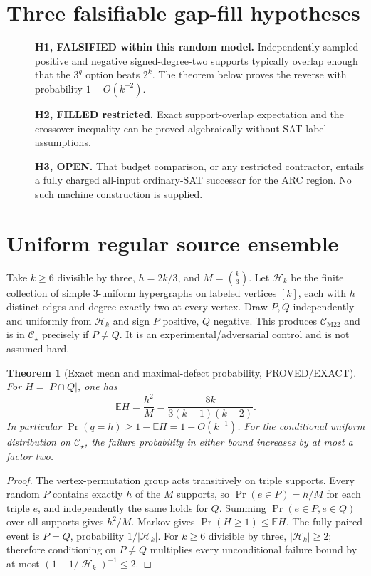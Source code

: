 \documentclass[11pt]{article}
\newtheorem{theorem}{Theorem}
\newcommand{\CM}{\mathcal C_{\mathrm{M22}}}
\newcommand{\CS}{\mathcal C_{\star}}
\begin{document}
\section{Three falsifiable gap-fill hypotheses}
\begin{description}
\item[] \textbf{H1, FALSIFIED within this random model.} Independently sampled positive and negative signed-degree-two supports typically overlap enough that the $3^q$ option beats $2^k$. The theorem below proves the reverse with probability $1-O(k^{-2})$.
\item[] \textbf{H2, FILLED restricted.} Exact support-overlap expectation and the crossover inequality can be proved algebraically without SAT-label assumptions.
\item[] \textbf{H3, OPEN.} That budget comparison, or any restricted contractor, entails a fully charged all-input ordinary-SAT successor for the ARC region. No such machine construction is supplied.
\end{description}

\section{Uniform regular source ensemble}
Take $k\ge6$ divisible by three, $h=2k/3$, and $M=\binom{k}{3}$. Let $\mathcal H_k$ be the finite collection of simple $3$-uniform hypergraphs on labeled vertices $[k]$, each with $h$ distinct edges and degree exactly two at every vertex. Draw $P,Q$ independently and uniformly from $\mathcal H_k$ and sign $P$ positive, $Q$ negative. This produces $\CM$ and is in $\CS$ precisely if $P\ne Q$. It is an experimental/adversarial control and is not assumed hard.

\begin{theorem}[Exact mean and maximal-defect probability, PROVED/EXACT]\label{th:mean}
For $H=|P\cap Q|$, one has
\[
\boxed{\mathbb EH=\frac{h^2}{M}
=\frac{8k}{3(k-1)(k-2)}.}
\]
In particular $\Pr(q=h)\ge 1-\mathbb EH=1-O(k^{-1})$. For the conditional uniform distribution on $\CS$, the failure probability in either bound increases by at most a factor two.
\end{theorem}
\begin{proof}
The vertex-permutation group acts transitively on triple supports. Every random $P$ contains exactly $h$ of the $M$ supports, so $\Pr(e\in P)=h/M$ for each triple $e$, and independently the same holds for $Q$. Summing $\Pr(e\in P,e\in Q)$ over all supports gives $h^2/M$. Markov gives $\Pr(H\ge1)\le\mathbb EH$. The fully paired event is $P=Q$, probability $1/|\mathcal H_k|$. For $k\ge6$ divisible by three, $|\mathcal H_k|\ge2$; therefore conditioning on $P\ne Q$ multiplies every unconditional failure bound by at most $(1-1/|\mathcal H_k|)^{-1}\le2$.
\end{proof}
\end{document}
